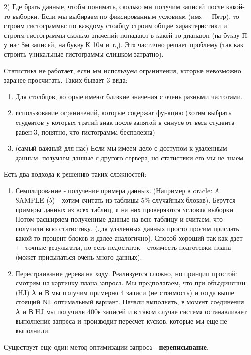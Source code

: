 2) Где брать данные, чтобы понимать, сколько мы получим записей после какой-то выборки. Если мы выбираем по фиксированным условиям (имя = Петр), то строим гистограммы: по каждому столбцу строим общие характеристики и строим гистограммы сколько значений попадают в какой-то диапазон (на букву П у нас 8м записей, на букву К 10м и тд). Это частично решает проблему (так как строить уникальные гистограммы слишком затратно). 

Статистика не работает, если мы используем ограничения, которые невозможно заранее просчитать. Таких бывает 3 вида: 
\begin{enumerate}
	\item Для столбцов, которые имеют близкие значения с очень разными частотами.
	\item использование ограничений, которые содержат функцию (хотим выбрать студентов у которых третий знак после запятой в синусе от веса студента равен 3, понятно, что гистограмма бесполезна) 
	\item (самый важный для нас) Если мы имеем дело с доступом к удаленным данным: получаем данные с другого сервера, но статистики его мы не знаем.
\end{enumerate}

Есть два подхода к решению таких сложностей: 

\begin{enumerate}
	\item Семплирование - получение примера данных. (Например в oracle: A SAMPLE (5) - хотим считать из таблицы 5\% случайных блоков). Берутся примеры данных из всех таблиц, и на них проверяются условия выборки. Потом расширяем полученные данные на всю таблицу и считаем, что получили всю статистику. (для удаленных данных просто просим прислать какой-то процент блоков и далее аналогично). Способ хороший так как дает +- точные результаты, но есть недостаток - стоимость подготовки плана (может присылаться очень много данных).
	\item Перестраивание дерева на ходу. Реализуется сложно, но принцип простой:  смотрим на картинку плана запроса. Мы предполагаем, что при объединении (HJ) А и В мы получим примерно 4 записи (не стоимость) и тогда выше стоящий NL оптимальный вариант. Начали выполнять, в момент соединения А и В HJ мы получили 400к записей и в таком случае система останавливает выполнение запроса и производит пересчет кусков, которые мы еще не выполнили.
\end{enumerate}

Существует еще один метод оптимизации запроса - \textbf{переписывание}. 

